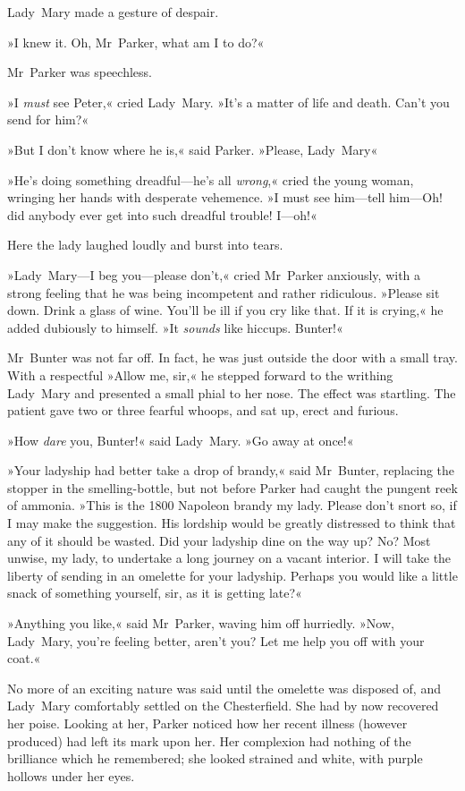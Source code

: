Lady~Mary made a gesture of despair.

»I knew it. Oh, Mr~Parker, what am I to do?«

Mr~Parker was speechless.

»I \textit{must} see Peter,« cried Lady~Mary. »It's a matter of life and death. Can't you send for him?«

»But I don't know where he is,« said Parker. »Please, Lady~Mary\longdash«

»He's doing something dreadful—he's all \textit{wrong},« cried the young woman, wringing her hands with desperate vehemence. »I must see him—tell him—Oh! did anybody ever get into such dreadful trouble! I—oh!\longdash«

Here the lady laughed loudly and burst into tears.

»Lady~Mary—I beg you—please don't,« cried Mr~Parker anxiously, with a strong feeling that he was being incompetent and rather ridiculous.  »Please sit down. Drink a glass of wine. You'll be ill if you cry like that. If it is crying,« he added dubiously to himself. »It \textit{sounds} like hiccups. Bunter!«

Mr~Bunter was not far off. In fact, he was just outside the door with a small tray. With a respectful »Allow me, sir,« he stepped forward to the writhing Lady~Mary and presented a small phial to her nose. The effect was startling. The patient gave two or three fearful whoops, and sat up, erect and furious.

»How \textit{dare} you, Bunter!« said Lady~Mary. »Go away at once!«

»Your ladyship had better take a drop of brandy,« said Mr~Bunter, replacing the stopper in the smelling-bottle, but not before Parker had caught the pungent reek of ammonia. »This is the 1800 Napoleon brandy my lady. Please don't snort so, if I may make the suggestion.  His lordship would be greatly distressed to think that any of it should be wasted. Did your ladyship dine on the way up? No? Most unwise, my lady, to undertake a long journey on a vacant interior. I will take the liberty of sending in an omelette for your ladyship. Perhaps you would like a little snack of something yourself, sir, as it is getting late?«

»Anything you like,« said Mr~Parker, waving him off hurriedly. »Now, Lady~Mary, you're feeling better, aren't you? Let me help you off with your coat.«

No more of an exciting nature was said until the omelette was disposed of, and Lady~Mary comfortably settled on the Chesterfield. She had by now recovered her poise. Looking at her, Parker noticed how her recent illness (however produced) had left its mark upon her. Her complexion had nothing of the brilliance which he remembered; she looked strained and white, with purple hollows under her eyes.


